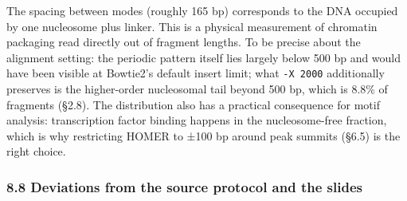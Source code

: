\documentclass[
  11pt,
  a4paper,
]{article}
\begin{document}
The spacing between modes (roughly 165 bp) corresponds to the DNA
occupied by one nucleosome plus linker. This is a physical measurement
of chromatin packaging read directly out of fragment lengths. To be
precise about the alignment setting: the periodic pattern itself lies
largely below 500 bp and would have been visible at Bowtie2's default
insert limit; what \texttt{-X\ 2000} additionally preserves is the
higher-order nucleosomal tail beyond 500 bp, which is 8.8\% of fragments
(§2.8). The distribution also has a practical consequence for motif
analysis: transcription factor binding happens in the nucleosome-free
fraction, which is why restricting HOMER to ±100 bp around peak summits
(§6.5) is the right choice.

\hypertarget{deviations-from-the-source-protocol-and-the-slides}{%
\subsubsection{8.8 Deviations from the source protocol and the
slides}\label{deviations-from-the-source-protocol-and-the-slides}}
\end{document}
